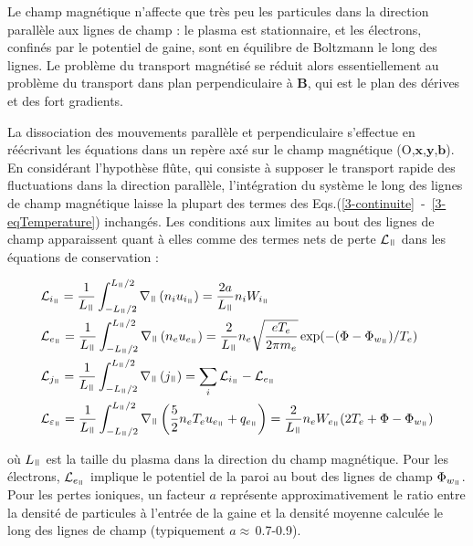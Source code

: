 \begin{refsection}
Le champ magnétique n'affecte que très peu les particules dans la direction
parallèle aux lignes de champ : le plasma est stationnaire, et les électrons,
confinés par le potentiel de gaine, sont en équilibre de Boltzmann le long des
lignes.
Le problème du transport magnétisé se réduit alors essentiellement au problème du transport
dans plan perpendiculaire à $\mathbf B$, qui est le plan des dérives et des
fort gradients.

La dissociation des mouvements parallèle et perpendiculaire s'effectue
en réécrivant les équations dans un repère axé sur le champ magnétique
(O,$\mathbf x$,$\mathbf y$,$\mathbf b$). En considérant l'hypothèse flûte, qui
consiste à supposer le transport rapide des fluctuations dans la direction
parallèle, l'intégration du système le long des lignes de champ magnétique
laisse la plupart des termes des
Eqs.(\ref{3-continuite}~-~\ref{3-eqTemperature}) inchangés.
Les conditions aux limites au bout des lignes de champ apparaissent quant à
elles comme des termes nets de perte $\mathcal L_\para$ 
dans les équations de conservation :

\begin{align}
\label{3-vitessesBord}
\begin{split}
\mathcal{L}&_{i_\para}=\frac{1}{L_\para}\int_{-L_\para/2}^{L_\para/2}\nabla_\para\left(n_iu_{i_\para}\right)=\frac{2a}{L_\para}n_iW_{i_\para}\\
\mathcal{L}&_{e_\para}=\frac{1}{L_\para}\int_{-L_\para/2}^{L_\para/2}\nabla_\para\left(n_eu_{e_\para}\right)=\frac{2}{L_\para}n_e\sqrt{\frac{eT_e}{2\pi
m_e}}\exp(-(\Phi-\Phi_{w_\para})/T_e)\\
\mathcal{L}&_{j_\para}=\frac{1}{L_\para}\int_{-L_\para/2}^{L_\para/2}\nabla_\para\left(j_\para\right)=\sum_i\mathcal{L}_{i_\para}-\mathcal{L}_{e_\para}\\
\mathcal{L}&_{\varepsilon_\para}=\frac{1}{L_\para}
\int_{-L_\para/2}^{L_\para/2}\nabla_\para
\left(\frac{5}{2}n_eT_eu_{e_\para}+q_{e_\para}\right)
=\frac{2}{L_\para}n_eW_{e_\para}(2T_e+\Phi-\Phi_{w_\para})
\end{split}
\end{align}

où $L_\para$ est la taille du plasma dans la direction du champ magnétique. Pour
les électrons, $\mathcal{L}_{e_\para}$ implique le potentiel de la
paroi au bout des lignes de champ $\Phi_{w_\para}$. Pour les pertes ioniques, un
facteur $a$ représente approximativement le ratio entre la densité de particules à l'entrée
de la gaine et la densité moyenne calculée le long des lignes de champ
(typiquement $a\approx\,$0.7-0.9).


\end{refsection}
